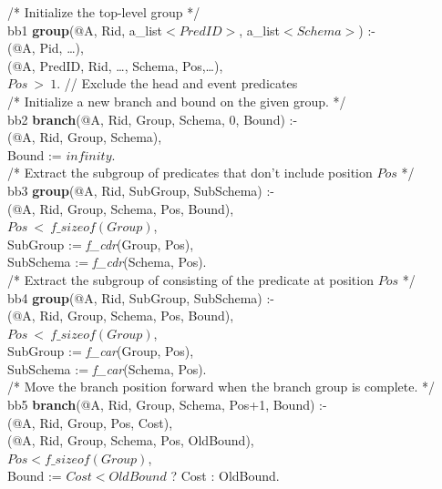 \begin{figure*}
\ssp
\centering
\begin{boxedminipage}{\linewidth}
/* Initialize the top-level group */ \\
bb1 {\bf group}(@A, Rid, a\_list$<PredID>$, a\_list$<Schema>$) :- \\
(@A, Pid, \ldots),\\
(@A, PredID, Rid, \ldots, Schema, Pos,\ldots),\\
\datalogspace $Pos\ >\ 1$. // Exclude the head and event predicates \\

/* Initialize a new branch and bound on the given group. */ \\
bb2 {\bf branch}(@A, Rid, Group, Schema, 0, Bound) :- \\
(@A, Rid, Group, Schema), \\
\datalogspace Bound := $infinity$. \\

/* Extract the subgroup of predicates that don't include position $Pos$ */ \\
bb3 {\bf group}(@A, Rid, SubGroup, SubSchema) :- \\
(@A, Rid, Group, Schema, Pos, Bound), \\
\datalogspace $Pos\ <\ f\_sizeof(Group)$, \\
\datalogspace SubGroup  := {\em f\_cdr}(Group, Pos), \\
\datalogspace SubSchema := {\em f\_cdr}(Schema, Pos). \\

/* Extract the subgroup of consisting of the predicate at position $Pos$ */ \\
bb4 {\bf group}(@A, Rid, SubGroup, SubSchema) :- \\
(@A, Rid, Group, Schema, Pos, Bound), \\
\datalogspace $Pos\ <\ f\_sizeof(Group)$, \\
\datalogspace SubGroup := {\em f\_car}(Group, Pos), \\
\datalogspace SubSchema := {\em f\_car}(Schema, Pos). \\

/* Move the branch position forward when the branch group is complete. */ \\
bb5 {\bf branch}(@A, Rid, Group, Schema, Pos+1, Bound) :- \\
(@A, Rid, Group, Pos, Cost), \\
(@A, Rid, Group, Schema, Pos, OldBound), \\
\datalogspace $Pos < f\_sizeof(Group)$, \\
\datalogspace Bound := $Cost < OldBound$ ? Cost : OldBound. \\


\end{boxedminipage}
\end{figure*}
